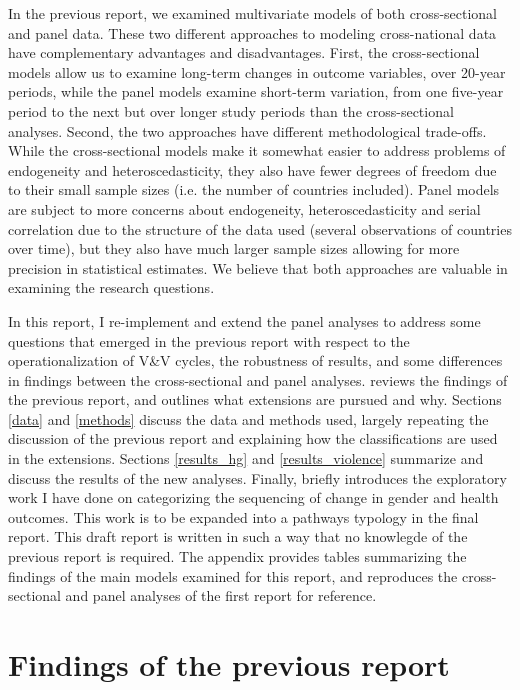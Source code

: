 \documentclass[12pt]{article}
\begin{document}
In the previous report, we examined multivariate models of both cross-sectional and panel data. These two different approaches to modeling cross-national data have complementary advantages and disadvantages.
First, the cross-sectional models allow us to examine long-term changes in outcome variables, over 20-year periods, while the panel models examine short-term variation, from one five-year period to the next but over longer study periods than the cross-sectional analyses.
Second, the two approaches have different methodological trade-offs. While the cross-sectional models make it somewhat easier to address problems of endogeneity and heteroscedasticity, they also have fewer degrees of freedom due to their small sample sizes (i.e. the number of countries included). Panel models are subject to more concerns about endogeneity, heteroscedasticity and serial correlation due to the structure of the data used (several observations of countries over time), but they also have much larger sample sizes allowing for more precision in statistical estimates. We believe that both approaches are valuable in examining the research questions.

In this report, I re-implement and extend the panel analyses to address some questions that emerged in the previous report with respect to the operationalization of V\&V cycles, the robustness of results, and some differences in findings between the cross-sectional and panel analyses.  reviews the findings of the previous report, and  outlines what extensions are pursued and why. Sections \ref{data} and \ref{methods} discuss the data and methods used, largely repeating the discussion of the previous report and explaining how the classifications are used in the extensions. Sections \ref{results_hg} and \ref{results_violence} summarize and discuss the results of the new analyses. Finally,  briefly introduces the exploratory work I have done on categorizing the sequencing of change in gender and health outcomes. This work is to be expanded into a pathways typology in the final report.
This draft report is written in such a way that no knowlegde of the previous report is required.
The appendix provides tables summarizing the findings of the main models examined for this report, and reproduces the cross-sectional and panel analyses of the first report for reference.

\section{Findings of the previous report}
\label{previous}
\end{document}
